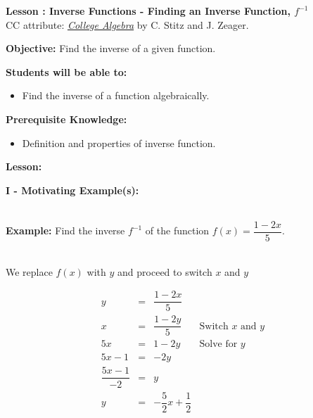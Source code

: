 \documentclass[12pt]{article}
\theoremstyle{definition}
\begin{document}
{\bf \large Lesson : Inverse Functions - Finding an Inverse Function, $f^{-1}$}\label{les:finding_an_inverse_function}
\\ CC attribute: \href{http://www.stitz-zeager.com}{\it{College Algebra}} by C. Stitz and J. Zeager. 
\hfill \doclicenseImage[imagewidth=5em]\\
\par
{\bf Objective:} 	Find the inverse of a given function.\\  
\par
{\bf Students will be able to:}
\begin{itemize}
	\item Find the inverse of a function algebraically.
\end{itemize}
{\bf Prerequisite Knowledge:}
\begin{itemize}
	\item Definition and properties of inverse function.
\end{itemize}
\hrulefill

{\bf Lesson:}
\begin{center}
\end{center}

{\bf I - Motivating Example(s):}\\
\ \par
{\bf Example:}  Find the inverse $f^{-1}$ of the function $f(x)=\dfrac{1-2x}{5}$.\\
\ \par
We replace $f(x)$ with $y$ and proceed to switch $x$ and $y$

\[ \begin{array}{rcll}
y & = &  \dfrac{1-2x}{5} & \\ [6pt]
x & = & \dfrac{1-2y}{5} & \mbox{Switch $x$ and $y$} \\ [6pt]
5x & = & 1 - 2y & \mbox{Solve for $y$} \\ [6pt]
5x-1 & = & -2y & \\ 
\dfrac{5x-1}{-2} & = & y & \\ 
y & = & -\dfrac{5}{2} x + \dfrac{1}{2} & 
\end{array} \]
\end{document}
